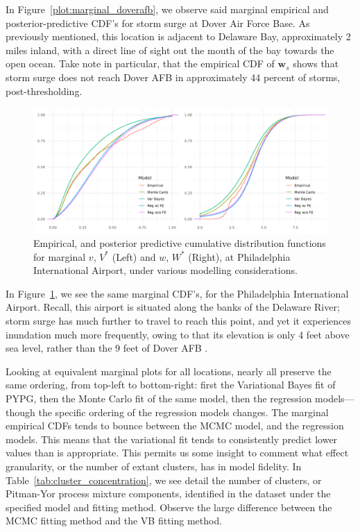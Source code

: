 In Figure~\ref{plot:marginal_doverafb}, we observe said marginal empirical and posterior-predictive
    CDF's for storm surge at Dover Air Force Base.  As previously mentioned, this location is adjacent
    to Delaware Bay, approximately 2 miles inland, with a direct line of sight out the mouth of the
    bay towards the open ocean.  Take note in particular, that the empirical CDF of $\bm{w}_s$ shows
    that storm surge does not reach Dover AFB in approximately \num{44} percent of storms, 
    post-thresholding.

\begin{figure}[ht]
    \caption{Empirical, and posterior predictive cumulative distribution functions for marginal 
    $v$, $V^*$ (Left) and $w$, $W^*$ (Right), at Philadelphia International Airport, under 
    various modelling considerations.\label{plot:marginal_pia}}
    \centering
    \includegraphics[width=\textwidth]{./plots/delaware_marginal_phil_ia.png}
\end{figure}

In Figure~\ref{plot:marginal_pia}, we see the same marginal CDF's, for the Philadelphia International
    Airport.  Recall, this airport is situated along the banks of the Delaware River; storm surge
    has much further to travel to reach this point, and yet it experiences inundation much more 
    frequently, owing to that its elevation is only 4 feet above sea level, rather than the 9 feet
    of Dover AFB \makenote{[confirm]}.



Looking at equivalent marginal plots for all locations, nearly all preserve the
    same ordering, from top-left to bottom-right: first the Variational Bayes fit of PYPG, then the 
    Monte Carlo fit of the same model, then the regression models---though the specific ordering of
    the regression models changes.  The marginal empirical CDFs tends to bounce\makenote{[rephrase]}
    between the MCMC model, and the regression models.  This means that the variational fit
    tends to consistently predict lower values than is appropriate. This permits us some insight 
    to comment what effect granularity, or the number of extant clusters, has in model fidelity.
    In Table~\ref{tab:cluster_concentration}, we see detail the number of clusters, or Pitman-Yor
    process mixture components, identified in the dataset under the specified model and fitting 
    method.  Observe the large difference between the MCMC fitting method and the VB fitting
    method. 







    




